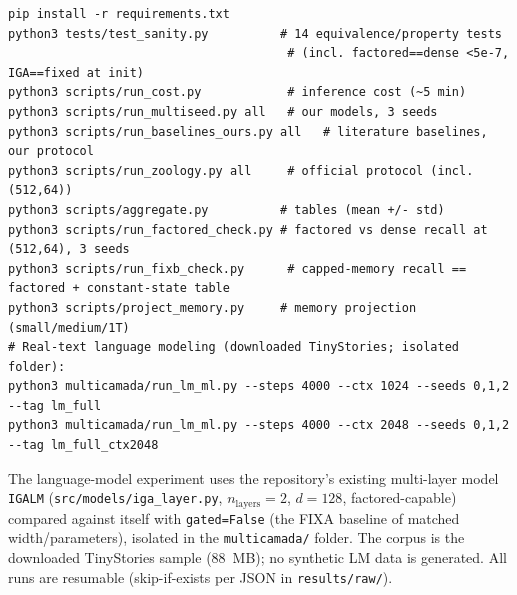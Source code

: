 \documentclass[11pt]{article}
\begin{document}
\begin{verbatim}
pip install -r requirements.txt
python3 tests/test_sanity.py          # 14 equivalence/property tests
                                       # (incl. factored==dense <5e-7, IGA==fixed at init)
python3 scripts/run_cost.py            # inference cost (~5 min)
python3 scripts/run_multiseed.py all   # our models, 3 seeds
python3 scripts/run_baselines_ours.py all   # literature baselines, our protocol
python3 scripts/run_zoology.py all     # official protocol (incl. (512,64))
python3 scripts/aggregate.py          # tables (mean +/- std)
python3 scripts/run_factored_check.py # factored vs dense recall at (512,64), 3 seeds
python3 scripts/run_fixb_check.py      # capped-memory recall == factored + constant-state table
python3 scripts/project_memory.py     # memory projection (small/medium/1T)
# Real-text language modeling (downloaded TinyStories; isolated folder):
python3 multicamada/run_lm_ml.py --steps 4000 --ctx 1024 --seeds 0,1,2 --tag lm_full
python3 multicamada/run_lm_ml.py --steps 4000 --ctx 2048 --seeds 0,1,2 --tag lm_full_ctx2048
\end{verbatim}

The language-model experiment uses the repository's existing multi-layer model
\texttt{IGALM} (\texttt{src/models/iga\_layer.py},
$n_{\mathrm{layers}}{=}2$, $d=128$, factored-capable) compared against itself with
\texttt{gated=False} (the FIXA baseline of matched width/parameters), isolated in
the \texttt{multicamada/} folder. The corpus is the downloaded TinyStories sample
(88~MB); no synthetic LM data is generated. All runs are resumable
(skip-if-exists per JSON in \texttt{results/raw/}).


\end{document}
